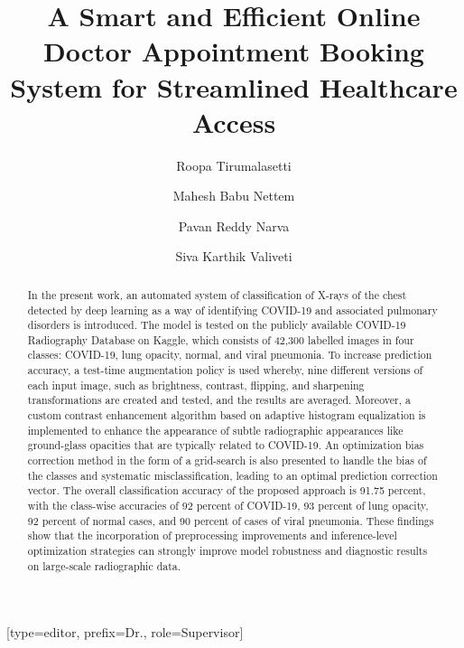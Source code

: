 \documentclass[a4paper,fleqn]{cas-dc}
\begin{document}
\let\ref\Cref 		
\let\eqref\Cref 	
\let\autoref\Cref 	
\let\WriteBookmarks\relax
\def\floatpagepagefraction{1}
\def\textpagefraction{.001}

\title [mode = title]{A Smart and Efficient Online Doctor Appointment Booking System for Streamlined Healthcare Access}

\author[1]{Roopa Tirumalasetti}[type=editor, 
                        prefix=Dr.,
                        role=Supervisor]
\cormark[1]

\address[1]{SRM University-AP, Andhra Pradesh, India}

\author[1]{Mahesh Babu Nettem}
\author[1]{Pavan Reddy Narva}
\author[1]{Siva Karthik Valiveti}


\begin{abstract} 
In the present work, an automated system of classification of X-rays of the chest detected by deep learning as a way of identifying COVID-19 and associated pulmonary disorders is introduced. The model is tested on the publicly available COVID-19 Radiography Database on Kaggle, which consists of 42,300 labelled images in four classes: COVID-19, lung opacity, normal, and viral pneumonia. To increase prediction accuracy, a test-time augmentation policy is used whereby, nine different versions of each input image, such as brightness, contrast, flipping, and sharpening transformations are created and tested, and the results are averaged. Moreover, a custom contrast enhancement algorithm based on adaptive histogram equalization is implemented to enhance the appearance of subtle radiographic appearances like ground-glass opacities that are typically related to COVID-19. An optimization bias correction method in the form of a grid-search is also presented to handle the bias of the classes and systematic misclassification, leading to an optimal prediction correction vector. The overall classification accuracy of the proposed approach is 91.75 percent, with the class-wise accuracies of 92 percent of COVID-19, 93 percent of lung opacity, 92 percent of normal cases, and 90 percent of cases of viral pneumonia. These findings show that the incorporation of preprocessing improvements and inference-level optimization strategies can strongly improve model robustness and diagnostic results on large-scale radiographic data.
\end{abstract}
\end{document}
